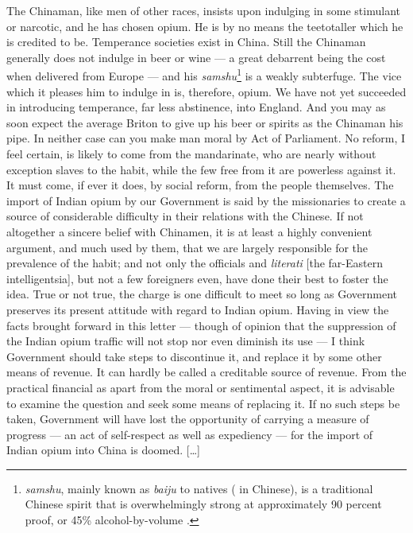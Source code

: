 \begin{mdframed}[style=fancyquote]
        [\ldots] The Chinaman, like men of other races, insists upon indulging
        in some stimulant or narcotic, and he has chosen opium. He is by no
        means the teetotaller which he is credited to be. Temperance societies
        exist in China. Still the Chinaman generally does not indulge in beer or
        wine --- a great debarrent being the cost when delivered from Europe ---
        and his \textit{samshu}\footnote{\textit{samshu}, mainly known as
        \textit{baiju} to natives ( in Chinese), is a traditional
        Chinese spirit that is overwhelmingly strong at approximately 90 percent
        proof, or 45\% alcohol-by-volume \autocite{Antkiewicz:1993}.} is a
        weakly subterfuge. The vice which it pleases him to indulge in is,
        therefore, opium. We have not yet succeeded in introducing temperance,
        far less abstinence, into England.  And you may as soon expect the
        average Briton to give up his beer or spirits as the Chinaman his pipe.
        In neither case can you make man moral by Act of Parliament. No reform,
        I feel certain, is likely to come from the mandarinate, who are nearly
        without exception slaves to the habit, while the few free from it are
        powerless against it. It must come, if ever it does, by social reform,
        from the people themselves. The import of Indian opium by our Government
        is said by the missionaries to create a source of considerable
        difficulty in their relations with the Chinese.  If not altogether a
        sincere belief with Chinamen, it is at least a highly convenient
        argument, and much used by them, that we are largely responsible for the
        prevalence of the habit; and not only the officials and
        \textit{literati} [the far-Eastern intelligentsia], but not a few
        foreigners even, have done their best to foster the idea. True or not
        true, the charge is one difficult to meet so long as Government
        preserves its present attitude with regard to Indian opium. Having in
        view the facts brought forward in this letter --- though of opinion that
        the suppression of the Indian opium traffic will not stop nor even
        diminish its use --- I think Government should take steps to discontinue
        it, and replace it by some other means of revenue. It can hardly be
        called a creditable source of revenue. From the practical financial as
        apart from the moral or sentimental aspect, it is advisable to examine
        the question and seek some means of replacing it. If no such steps be
        taken, Government will have lost the opportunity of carrying a measure
        of progress --- an act of self-respect as well as expediency --- for the
        import of Indian opium into China is doomed. [\ldots]
	\begin{flushright}
		\autocite{SpecialCorrespondent:1884}
	\end{flushright}
\end{mdframed}
